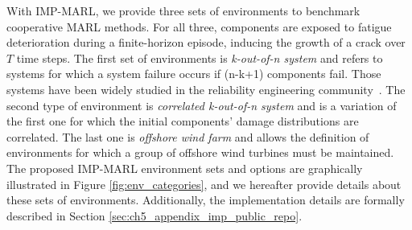 With IMP-MARL, we provide three sets of environments to benchmark cooperative MARL methods.
For all three, components are exposed to fatigue deterioration during a finite-horizon episode, inducing the growth of a crack over $T$ time steps.
The first set of environments is \textit{k-out-of-n system} and refers to systems for which a system failure occurs if (n-k+1) components fail.
Those systems have been widely studied in the reliability engineering community~\citep{barlow1984computing}. 
The second type of environment is \textit{correlated k-out-of-n system} and is a variation of the first one for which the initial components' damage distributions are correlated.
The last one is \textit{offshore wind farm} and allows the definition of environments for which a group of offshore wind turbines must be maintained.
The proposed IMP-MARL environment sets and options are graphically illustrated in Figure \ref{fig:env_categories}, and we hereafter provide details about these sets of environments.
Additionally, the implementation details are formally described in Section \ref{sec:ch5_appendix_imp_public_repo}.

